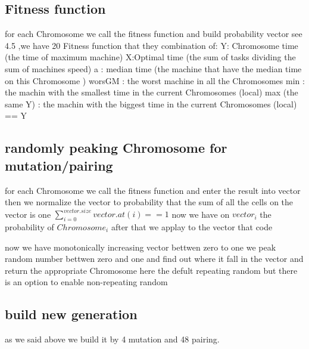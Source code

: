 \documentclass[11pt,fullpage]{article}
\begin{document}
\subsection{Fitness function} 
for each Chromosome we call the fitness function and build probability vector see 4.5 ,we have 20 Fitness function that they combination of:\newline
Y: Chromosome time (the time of maximum machine)\newline
X:Optimal time (the sum of tasks dividing the sum of machines speed)\newline
a : median time (the machine that have the median time on this Chromosome )
worsGM : the worst machine in all the Chromosomes\newline
min : the machin with the smallest time in the current Chromosomes (local)\newline
max (the same Y) : the machin with the biggest time in the current Chromosomes (local) == Y\newline

\subsection{randomly peaking Chromosome for mutation/pairing  }
for each Chromosome we call the fitness function and enter the result into vector then we normalize the vector to probability  that the sum of all the cells on the vector is one $\sum\limits_{i=0}^{vector.size} vector.at(i) ==1$ now we have on $vector_i$ the probability of $Chromosome_i$ after that we applay to the vector that code

 now we have monotonically increasing  vector bettwen zero to one we peak random number bettwen zero and one and find out where it fall in the vector and return the appropriate Chromosome\newline
here the defult  repeating random but there is an option to enable non-repeating random
 
  \subsection{ build new generation}
 as we said above we build it by 4 mutation and 48 pairing.

 

\end{document}
